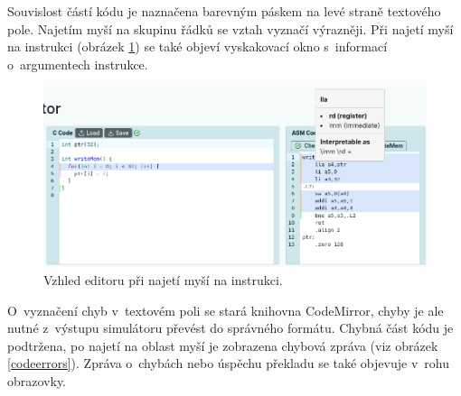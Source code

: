 Souvislost částí kódu je naznačena barevným páskem na levé straně textového pole.
Najetím myší na skupinu řádků se vztah vyznačí výrazněji.
Při najetí myší na instrukci (obrázek \ref{codeeditorhover_figure}) se také objeví vyskakovací okno s~informací o~argumentech instrukce.

\begin{figure}[hbtp]
    \begin{center}
        \includegraphics[width=15cm]{obrazky-figures/impl/codehover.png}
    \end{center}
    \caption{Vzhled editoru při najetí myší na instrukci.}
    \label{codeeditorhover_figure}
\end{figure}

O~vyznačení chyb v~textovém poli se stará knihovna CodeMirror, chyby je ale nutné z~výstupu simulátoru převést do správného formátu.
Chybná část kódu je podtržena, po najetí na oblast myší je zobrazena chybová zpráva (viz obrázek \ref{codeerrors}).
Zpráva o~chybách nebo úspěchu překladu se také objevuje v~rohu obrazovky.

